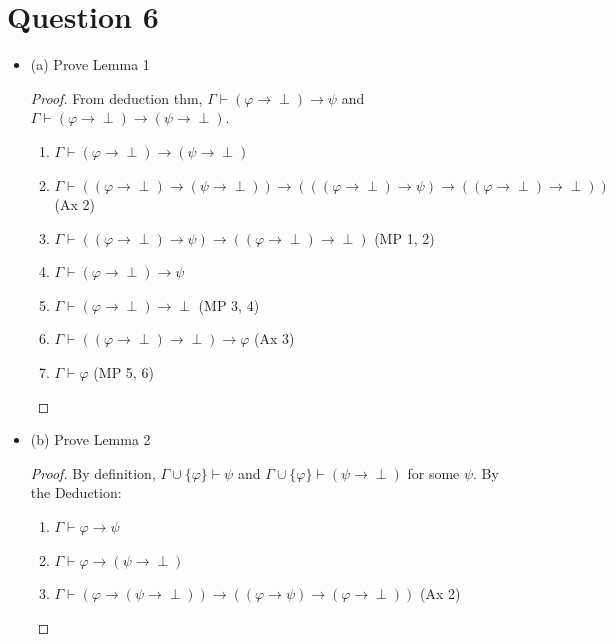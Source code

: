 \documentclass{article}
\begin{document}
\section*{Question 6}
\begin{itemize}
    \item (a) Prove Lemma 1
        \begin{proof}
            From deduction thm, $\Gamma \vdash (\varphi \rightarrow \perp) \rightarrow \psi$ and $\Gamma \vdash (\varphi \rightarrow \perp) \rightarrow (\psi \rightarrow \perp)$.
            \begin{enumerate}
                \item $\Gamma \vdash (\varphi \rightarrow \perp) \rightarrow (\psi \rightarrow \perp)$ 
                \item $\Gamma \vdash ((\varphi \rightarrow \perp) \rightarrow (\psi \rightarrow \perp)) \rightarrow (((\varphi \rightarrow \perp) \rightarrow \psi) \rightarrow ((\varphi \rightarrow \perp) \rightarrow \perp))$ (Ax 2)
                \item $\Gamma \vdash ((\varphi \rightarrow \perp) \rightarrow \psi) \rightarrow ((\varphi \rightarrow \perp) \rightarrow \perp)$ (MP 1, 2)
                \item $\Gamma \vdash (\varphi \rightarrow \perp) \rightarrow \psi$
                \item $\Gamma \vdash (\varphi \rightarrow \perp) \rightarrow \perp$ (MP 3, 4)
                \item $\Gamma \vdash ((\varphi \rightarrow \perp) \rightarrow \perp) \rightarrow \varphi$ (Ax 3)
                \item $\Gamma \vdash \varphi$ (MP 5, 6)
            \end{enumerate}
        \end{proof}
    \item (b) Prove Lemma 2
    \begin{proof}
        By definition, $\Gamma \cup \{\varphi\} \vdash \psi$ and $\Gamma \cup \{\varphi\} \vdash (\psi \rightarrow \perp)$ for some $\psi$. 
        By the Deduction:
        \begin{enumerate}
            \item $\Gamma \vdash \varphi \rightarrow \psi$
            \item $\Gamma \vdash \varphi \rightarrow (\psi \rightarrow \perp)$
            \item $\Gamma \vdash (\varphi \rightarrow (\psi \rightarrow \perp)) \rightarrow ((\varphi \rightarrow \psi) \rightarrow (\varphi \rightarrow \perp))$ (Ax 2)

\end{enumerate}
\end{proof}
\end{itemize}
\end{document}
